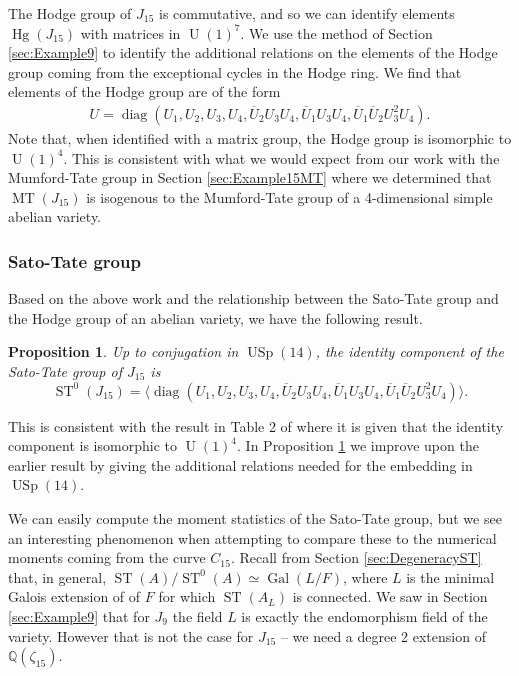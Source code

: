 \documentclass[reqno, oneside, 12pt]{amsart}
\DeclareMathOperator{\USp}{USp}
\DeclareMathOperator{\U}{U}
\DeclareMathOperator{\ST}{ST}
\DeclareMathOperator{\Gal}{Gal}
\DeclareMathOperator{\diag}{diag}
\DeclareMathOperator{\Hg}{Hg}
\DeclareMathOperator{\MT}{MT}
\newcommand{\Q}{\mathbb{Q}}
\newtheorem{proposition}[theorem]{Proposition}
\theoremstyle{remark}
\numberwithin{equation}{section}
\begin{document}
The Hodge group of $J_{15}$ is commutative, and so we can identify elements $\Hg(J_{15})$ with matrices in $\U(1)^7$. We use the method of Section \ref{sec:Example9} to identify the additional relations on the elements of the Hodge group coming from the  exceptional cycles in the Hodge ring. We find that elements of the Hodge group are of the form
\begin{align*}
    U=\diag(U_1,U_2,U_3,U_4,\overline U_2U_3U_4, \overline U_1U_3U_4, \overline U_1\overline U_2 U_3^2U_4).
\end{align*}
Note that, when identified with a matrix group, the Hodge group is isomorphic to $\U(1)^4$. This is consistent with what we would expect from our work with the Mumford-Tate group in Section \ref{sec:Example15MT} where we determined that $\MT(J_{15})$ is isogenous to the Mumford-Tate  group of a 4-dimensional simple abelian variety.  


\subsubsection{Sato-Tate group}
Based on the above work and the relationship between the Sato-Tate group and the Hodge group of an abelian variety, we have the following result.


\begin{proposition}\label{prop:STidentity15}
Up to conjugation in $\USp(14)$, the identity component of the Sato-Tate group of $J_{15}$ is
$$\ST^0(J_{15})=\langle\diag(U_1,U_2,U_3,U_4,\overline U_2U_3U_4, \overline U_1U_3U_4, \overline U_1\overline U_2 U_3^2U_4)\rangle.$$
\end{proposition}
This is consistent with the result in Table 2 of \cite{EmoryGoodsonPeyrot} where it is given that the identity component is isomorphic to $\U(1)^4$. In Proposition \ref{prop:STidentity15} we improve upon the earlier result by giving the additional relations needed for the embedding in $\USp(14)$.

We can easily compute the moment statistics of the Sato-Tate group, but we see an interesting phenomenon when attempting to compare these to the numerical moments coming from the curve $C_{15}$. Recall from Section \ref{sec:DegeneracyST} that, in general, $\ST(A)/\ST^0(A) \simeq \Gal(L/F)$, where $L$ is the minimal Galois extension of of $F$ for which $\ST(A_L)$ is connected. We saw in Section \ref{sec:Example9} that for $J_9$ the field $L$ is exactly the endomorphism field of the variety. However that is not the case for $J_{15}$ -- we need a degree 2 extension of $\Q(\zeta_{15})$.
\end{document}
